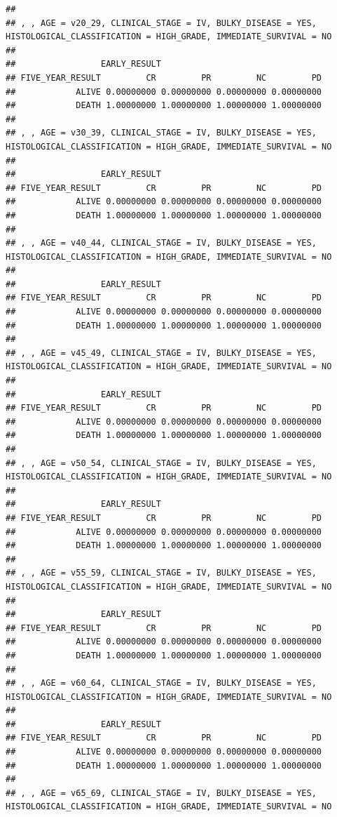 \documentclass[]{article}
\begin{document}
\begin{verbatim}
## 
## , , AGE = v20_29, CLINICAL_STAGE = IV, BULKY_DISEASE = YES, HISTOLOGICAL_CLASSIFICATION = HIGH_GRADE, IMMEDIATE_SURVIVAL = NO
## 
##                 EARLY_RESULT
## FIVE_YEAR_RESULT         CR         PR         NC         PD
##            ALIVE 0.00000000 0.00000000 0.00000000 0.00000000
##            DEATH 1.00000000 1.00000000 1.00000000 1.00000000
## 
## , , AGE = v30_39, CLINICAL_STAGE = IV, BULKY_DISEASE = YES, HISTOLOGICAL_CLASSIFICATION = HIGH_GRADE, IMMEDIATE_SURVIVAL = NO
## 
##                 EARLY_RESULT
## FIVE_YEAR_RESULT         CR         PR         NC         PD
##            ALIVE 0.00000000 0.00000000 0.00000000 0.00000000
##            DEATH 1.00000000 1.00000000 1.00000000 1.00000000
## 
## , , AGE = v40_44, CLINICAL_STAGE = IV, BULKY_DISEASE = YES, HISTOLOGICAL_CLASSIFICATION = HIGH_GRADE, IMMEDIATE_SURVIVAL = NO
## 
##                 EARLY_RESULT
## FIVE_YEAR_RESULT         CR         PR         NC         PD
##            ALIVE 0.00000000 0.00000000 0.00000000 0.00000000
##            DEATH 1.00000000 1.00000000 1.00000000 1.00000000
## 
## , , AGE = v45_49, CLINICAL_STAGE = IV, BULKY_DISEASE = YES, HISTOLOGICAL_CLASSIFICATION = HIGH_GRADE, IMMEDIATE_SURVIVAL = NO
## 
##                 EARLY_RESULT
## FIVE_YEAR_RESULT         CR         PR         NC         PD
##            ALIVE 0.00000000 0.00000000 0.00000000 0.00000000
##            DEATH 1.00000000 1.00000000 1.00000000 1.00000000
## 
## , , AGE = v50_54, CLINICAL_STAGE = IV, BULKY_DISEASE = YES, HISTOLOGICAL_CLASSIFICATION = HIGH_GRADE, IMMEDIATE_SURVIVAL = NO
## 
##                 EARLY_RESULT
## FIVE_YEAR_RESULT         CR         PR         NC         PD
##            ALIVE 0.00000000 0.00000000 0.00000000 0.00000000
##            DEATH 1.00000000 1.00000000 1.00000000 1.00000000
## 
## , , AGE = v55_59, CLINICAL_STAGE = IV, BULKY_DISEASE = YES, HISTOLOGICAL_CLASSIFICATION = HIGH_GRADE, IMMEDIATE_SURVIVAL = NO
## 
##                 EARLY_RESULT
## FIVE_YEAR_RESULT         CR         PR         NC         PD
##            ALIVE 0.00000000 0.00000000 0.00000000 0.00000000
##            DEATH 1.00000000 1.00000000 1.00000000 1.00000000
## 
## , , AGE = v60_64, CLINICAL_STAGE = IV, BULKY_DISEASE = YES, HISTOLOGICAL_CLASSIFICATION = HIGH_GRADE, IMMEDIATE_SURVIVAL = NO
## 
##                 EARLY_RESULT
## FIVE_YEAR_RESULT         CR         PR         NC         PD
##            ALIVE 0.00000000 0.00000000 0.00000000 0.00000000
##            DEATH 1.00000000 1.00000000 1.00000000 1.00000000
## 
## , , AGE = v65_69, CLINICAL_STAGE = IV, BULKY_DISEASE = YES, HISTOLOGICAL_CLASSIFICATION = HIGH_GRADE, IMMEDIATE_SURVIVAL = NO

\end{verbatim}
\end{document}
